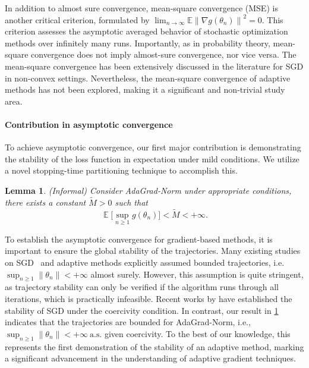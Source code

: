 \documentclass[standalone]{article}
\newcommand{\E}{\mathbb{E}}
\newtheorem{lem}{Lemma}[section]
\DeclareMathOperator{\Expect}{\mathbb{E}}
\begin{document}
In addition to almost sure convergence, mean-square convergence (MSE) is another critical criterion, formulated by $\lim_{n \rightarrow \infty} \E\left\|\nabla g(\theta_{n}) \right\|^2 = 0$. This criterion assesses the asymptotic averaged behavior of stochastic optimization methods over infinitely many runs. %
Importantly, as in probability theory, mean-square convergence does not imply almost-sure convergence, nor vice versa. The mean-square convergence has been extensively discussed in the literature \citep{li2022unified,bottou2018optimization} for SGD in non-convex settings. Nevertheless, the mean-square convergence of adaptive methods has not been explored, making it a significant and non-trivial study area. %








\paragraph{\textbf{Contribution in asymptotic convergence} } To achieve asymptotic convergence, our first major contribution is demonstrating the stability of the loss function in expectation under mild conditions. We utilize a novel stopping-time partitioning technique to accomplish this.
\begin{lem}\label{stable'} (Informal)
Consider AdaGrad-Norm under appropriate conditions, there exists a constant $\tilde{M} > 0$ such that
\begin{equation}\nonumber
\Expect\Big[\sup_{n \ge 1}g(\theta_{n})\Big] < \tilde{M} < +\infty.
\end{equation}
\end{lem}
To establish the asymptotic convergence for gradient-based methods, it is important to ensure the global stability of the trajectories. Many existing studies on SGD~\citep{ljung1977analysis,benaim2006dynamics,bolte2021conservative} and adaptive methods \citep{barakat2021convergence,JMLR:v25:23-0576} explicitly assumed bounded trajectories, i.e. \(\sup_{n\ge 1}\|\theta_{n}\|<+\infty\) almost surely. However, this assumption is quite stringent, as trajectory stability can only be verified if the algorithm runs through all iterations, which is practically infeasible.  Recent works by  \cite{josz2023lyapunov,xiao2023convergence} have established the stability of SGD under the coercivity condition. In contrast, our result in \cref{stable'} indicates that the trajectories are bounded for AdaGrad-Norm, i.e., \(\sup_{n\ge 1}\|\theta_{n}\|<+\infty\ \text{a.s.}\) given coercivity. To the best of our knowledge, this represents the first demonstration of the stability of an adaptive method, marking a significant advancement in the understanding of adaptive gradient techniques. 
\end{document}
